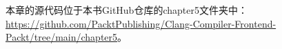 
本章的源代码位于本书GitHub仓库的chapter5文件夹中： \url{https://github.com/PacktPublishing/Clang-Compiler-Frontend-Packt/tree/main/chapter5}。
